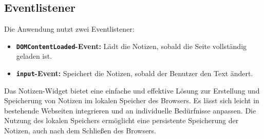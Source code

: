 \subsection*{Eventlistener}
Die Anwendung nutzt zwei Eventlistener:

\begin{itemize}
    \item \textbf{\texttt{DOMContentLoaded}-Event:}
    Lädt die Notizen, sobald die Seite vollständig geladen ist.
    
    \item \textbf{\texttt{input}-Event:}
    Speichert die Notizen, sobald der Benutzer den Text ändert.
\end{itemize}

\noindent
Das Notizen-Widget bietet eine einfache und effektive Lösung zur Erstellung und Speicherung von Notizen im lokalen Speicher des Browsers. Es lässt sich leicht in bestehende Webseiten integrieren und an individuelle Bedürfnisse anpassen. Die Nutzung des lokalen Speichers ermöglicht eine persistente Speicherung der Notizen, auch nach dem Schließen des Browsers.


